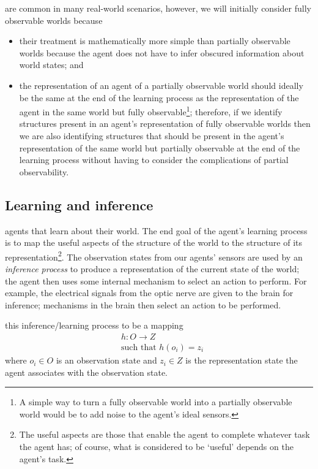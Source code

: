  are common in many real-world scenarios, however, we will initially consider fully observable worlds because
\begin{itemize}
    \item their treatment is mathematically more simple than partially observable worlds because the agent does not have to infer obscured information about world states; and
    \item the representation of an agent of a partially observable world should ideally be the same at the end of the learning process as the representation of the agent in the same world but fully observable\footnote{
    A simple way to turn a fully observable world into a partially observable world would be to add noise to the agent's ideal sensors.
    }; therefore, if we identify structures present in an agent's representation of fully observable worlds then we are also identifying structures that should be present in the agent's representation of the same world but partially observable at the end of the learning process without having to consider the complications of partial observability.
\end{itemize}

\subsection{Learning and inference}

 agents that learn about their world.
The end goal of the agent’s learning process is to map the useful aspects of the structure of the world to the structure of its representation\footnote{
The useful aspects are those that enable the agent to complete whatever task the agent has; of course, what is considered to be `useful' depends on the agent's task.
}.
The observation states from our agents' sensors are used by an \emph{inference process} to produce a representation of the current state of the world; the agent then uses some internal mechanism to select an action to perform.
For example, the electrical signals from the optic nerve are given to the brain for inference; mechanisms in the brain then select an action to be performed.

 this inference/learning process to be a mapping
\begin{equation}
\begin{aligned}
	& h: O \to Z \\
	& \text{such that } h(o_{i}) = z_{i}
\end{aligned}
\end{equation}
where $o_{i} \in O$ is an observation state and $z_{i} \in Z$ is the representation state the agent associates with the observation state.


